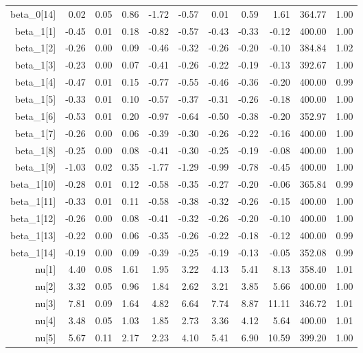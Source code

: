 \begin{longtable}{rrrrrrrrrrr}
  beta_0[14] & 0.02 & 0.05 & 0.86 & -1.72 & -0.57 & 0.01 & 0.59 & 1.61 & 364.77 & 1.00 \\ 
  beta_1[1] & -0.45 & 0.01 & 0.18 & -0.82 & -0.57 & -0.43 & -0.33 & -0.12 & 400.00 & 1.00 \\ 
  beta_1[2] & -0.26 & 0.00 & 0.09 & -0.46 & -0.32 & -0.26 & -0.20 & -0.10 & 384.84 & 1.02 \\ 
  beta_1[3] & -0.23 & 0.00 & 0.07 & -0.41 & -0.26 & -0.22 & -0.19 & -0.13 & 392.67 & 1.00 \\ 
  beta_1[4] & -0.47 & 0.01 & 0.15 & -0.77 & -0.55 & -0.46 & -0.36 & -0.20 & 400.00 & 0.99 \\ 
  beta_1[5] & -0.33 & 0.01 & 0.10 & -0.57 & -0.37 & -0.31 & -0.26 & -0.18 & 400.00 & 1.00 \\ 
  beta_1[6] & -0.53 & 0.01 & 0.20 & -0.97 & -0.64 & -0.50 & -0.38 & -0.20 & 352.97 & 1.00 \\ 
  beta_1[7] & -0.26 & 0.00 & 0.06 & -0.39 & -0.30 & -0.26 & -0.22 & -0.16 & 400.00 & 1.00 \\ 
  beta_1[8] & -0.25 & 0.00 & 0.08 & -0.41 & -0.30 & -0.25 & -0.19 & -0.08 & 400.00 & 1.00 \\ 
  beta_1[9] & -1.03 & 0.02 & 0.35 & -1.77 & -1.29 & -0.99 & -0.78 & -0.45 & 400.00 & 1.00 \\ 
  beta_1[10] & -0.28 & 0.01 & 0.12 & -0.58 & -0.35 & -0.27 & -0.20 & -0.06 & 365.84 & 0.99 \\ 
  beta_1[11] & -0.33 & 0.01 & 0.11 & -0.58 & -0.38 & -0.32 & -0.26 & -0.15 & 400.00 & 1.00 \\ 
  beta_1[12] & -0.26 & 0.00 & 0.08 & -0.41 & -0.32 & -0.26 & -0.20 & -0.10 & 400.00 & 1.00 \\ 
  beta_1[13] & -0.22 & 0.00 & 0.06 & -0.35 & -0.26 & -0.22 & -0.18 & -0.12 & 400.00 & 0.99 \\ 
  beta_1[14] & -0.19 & 0.00 & 0.09 & -0.39 & -0.25 & -0.19 & -0.13 & -0.05 & 352.08 & 0.99 \\ 
  nu[1] & 4.40 & 0.08 & 1.61 & 1.95 & 3.22 & 4.13 & 5.41 & 8.13 & 358.40 & 1.01 \\ 
  nu[2] & 3.32 & 0.05 & 0.96 & 1.84 & 2.62 & 3.21 & 3.85 & 5.66 & 400.00 & 1.00 \\ 
  nu[3] & 7.81 & 0.09 & 1.64 & 4.82 & 6.64 & 7.74 & 8.87 & 11.11 & 346.72 & 1.01 \\ 
  nu[4] & 3.48 & 0.05 & 1.03 & 1.85 & 2.73 & 3.36 & 4.12 & 5.64 & 400.00 & 1.01 \\ 
  nu[5] & 5.67 & 0.11 & 2.17 & 2.23 & 4.10 & 5.41 & 6.90 & 10.59 & 399.20 & 1.00 \\ 

\end{longtable}
